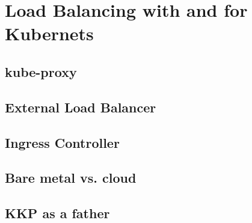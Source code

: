 \chapter{Load Balancing with and for Kubernets}

\section{kube-proxy}\label{sec:kubeproxy}

\section{External Load Balancer}\label{sec:ExternalLoadBalancer}

\section{Ingress Controller}\label{sec:IngressController}

\section{Bare metal vs. cloud}

\section{KKP as a father}

